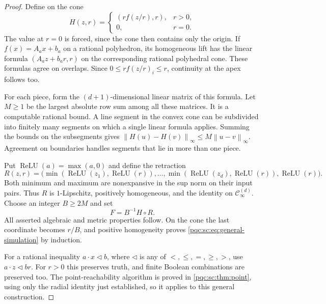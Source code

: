\documentclass[11pt,letterpaper]{article}
\numberwithin{equation}{section}
\theoremstyle{definition}
\theoremstyle{remark}
\newcommand{\norm}[1]{\left\lVert #1\right\rVert_{\infty}}
\newcommand{\ReLU}{\operatorname{ReLU}}
\newcommand{\Cinf}{\mathcal C_{\infty}}
\begin{document}
\begin{proof}
Define on the cone
\begin{equation}\label{pqc:sc:eq:perspective}
 H(z,r)=\begin{cases}(r f(z/r),r),&r>0,\\0,&r=0.\end{cases}
\end{equation}
The value at $r=0$ is forced, since the cone then contains only the origin.
If $f(x)=A_a x+b_a$ on a rational polyhedron, its homogeneous lift has the
linear formula $(A_a z+b_a r,r)$ on the corresponding rational polyhedral
cone. These formulas agree on overlaps. Since $0\le r f(z/r)_i\le r$,
continuity at the apex follows too.

For each piece, form the $(d+1)$-dimensional linear matrix of this formula.
Let $M\ge1$ be the largest absolute row sum among all these matrices.
It is a computable rational bound. A line segment in the convex cone can be
subdivided into finitely many segments on which a single linear formula
applies. Summing the bounds on the subsegments gives
$\norm{H(u)-H(v)}\le M\norm{u-v}$. Agreement on boundaries handles
segments that lie in more than one piece.

Put $\ReLU(a)=\max(a,0)$ and define the retraction
\begin{equation}\label{pqc:sc:eq:retract}
 R(z,r)=\bigl(\min(\ReLU(z_1),\ReLU(r)),\ldots,
                 \min(\ReLU(z_d),\ReLU(r)),\ReLU(r)\bigr).
\end{equation}
Both minimum and maximum are nonexpansive in the sup norm on their input
pairs. Thus $R$ is $1$-Lipschitz, positively homogeneous, and the identity on
$\Cinf^{(d)}$. Choose an integer $B\ge2M$ and set
\begin{equation}\label{pqc:sc:eq:Fgeneral}F=B^{-1}H\circ R.\end{equation}
All asserted algebraic and metric properties follow. On the cone the last
coordinate becomes $r/B$, and positive homogeneity proves
\eqref{pqc:sc:eq:general-simulation} by induction.

For a rational inequality $a\cdot x\mathrel{\triangleleft}b$, where
$\triangleleft$ is any of $<,\le,=,\ge,>$, use
$a\cdot z\mathrel{\triangleleft}br$. For $r>0$ this preserves truth,
and finite Boolean combinations are preserved too. The point-reachability
algorithm is proved in \cref{pqc:sc:thm:point}, using only the radial identity just
established, so it applies to this general construction.
\end{proof}
\end{document}
